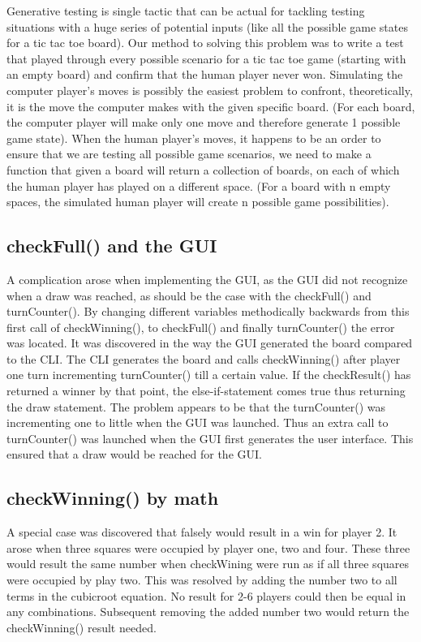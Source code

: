 \documentclass[a4paper,10pt]{article}
\begin{document}
	Generative testing is single tactic that can be actual for tackling testing situations with a huge series of potential inputs (like all the possible game states for a tic tac toe board).
Our method to solving this problem was to write a test that played through every possible scenario for a tic tac toe game (starting with an empty board) and confirm that the human player never won.
Simulating the computer player’s moves is possibly the easiest problem to confront, theoretically, it is the move the computer makes with the given specific board. (For each board, the computer player will make only one move and therefore generate 1 possible game state).
When the human player’s moves, it happens to be an order to ensure that we are testing all possible game scenarios, we need to make a function that given a board will return a collection of boards, on each of which the human player has played on a different space. (For a board with n empty spaces, the simulated human player will create n possible game possibilities).

	\subsection{checkFull() and the GUI}
	A complication arose when implementing the GUI, as the GUI did not recognize when a draw was reached, as should be the case with the checkFull() and turnCounter(). By changing different variables methodically backwards from this first call of checkWinning(), to checkFull() and finally turnCounter() the error was located. It was discovered in the way the GUI generated the board compared to the CLI.  The CLI generates the board and calls checkWinning() after player one turn incrementing turnCounter() till a certain value. If the checkResult() has returned a winner by that point, the else-if-statement comes true thus returning the draw statement.  
	The problem appears to be that the turnCounter() was incrementing one to little when the GUI was launched. Thus an extra call to turnCounter() was launched when the GUI first generates the user interface. This ensured that a draw would be reached for the GUI.
	
	\subsection{checkWinning() by math}
	A special case was discovered that falsely would result in a win for player 2. It arose when three squares were occupied by player one, two and four. These three would result the same number when checkWining were run as if all three squares were occupied by play two.
	This was resolved by adding the number two to all terms in the cubicroot equation. No result for 2-6 players could then be equal in any combinations. Subsequent removing the added number two would return the checkWinning() result needed.
	
\end{document}
